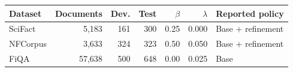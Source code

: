 \begin{tabular}{lrrrrrl}
\toprule
Dataset & Documents & Dev. & Test & $\beta$ & $\lambda$ & Reported policy\\
\midrule
SciFact & 5,183 & 161 & 300 & 0.25 & 0.000 & Base + refinement\\
NFCorpus & 3,633 & 324 & 323 & 0.50 & 0.050 & Base + refinement\\
FiQA & 57,638 & 500 & 648 & 0.00 & 0.025 & Base\\
\bottomrule
\end{tabular}
